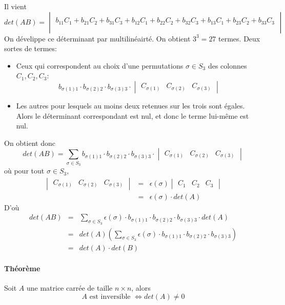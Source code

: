 Il vient
$$det(A B) = \begin{vmatrix} \\ b_{11} C_1 + b_{21} C_2 + b_{31} C_3 + b_{12} C_1 + b_{22} C_2 + b_{32} C_3 + b_{13} C_1 + b_{23} C_2 + b_{33} C_3 \\ \\ \end{vmatrix}$$
On dévelippe ce déterminant par multilinéairté. On obtient $3^3 = 27$ termes. Deux sortes de termes:
\begin{itemize}
  \item Ceux qui correspondent au choix d'une permutations $\sigma \in S_3$ des colonnes $C_1, C_2, C_3$:
    $$b_{\sigma(1) 1} \cdot b_{\sigma(2) 2} \cdot b_{\sigma(3) 3} \cdot \begin{vmatrix} C_{\sigma(1)} & C_{\sigma(2)} & C_{\sigma(3)} \end{vmatrix}$$
    
  \item Les autres pour lesquels au moins deux retenues sur les trois sont égales. Alors le déterminant correspondant est nul, et donc le terme lui-même est nul.
\end{itemize}
On obtient donc
$$det(A B) = \sum_{\sigma \in S_3} b_{\sigma(1) 1} \cdot b_{\sigma(2) 2} \cdot b_{\sigma(3) 3} \cdot \begin{vmatrix} C_{\sigma(1)} & C_{\sigma(2)} & C_{\sigma(3)} \end{vmatrix}$$
où pour tout $\sigma \in S_3$,
\begin{eqnarray*}
  \begin{vmatrix} C_{\sigma(1)} & C_{\sigma(2)} & C_{\sigma(3)} \end{vmatrix}
  &=& \epsilon(\sigma) \begin{vmatrix} C_1 & C_2 & C_ 3 \end{vmatrix} \\
    &=& \epsilon(\sigma) \cdot det(A)
\end{eqnarray*}
D'où
\begin{eqnarray*}
  det(A B) &=& \sum_{\sigma \in S_3} \epsilon(\sigma) \cdot b_{\sigma(1) 1} \cdot b_{\sigma(2) 2} \cdot b_{\sigma(3) 3} \cdot det(A) \\
    &=& det(A) \left( \sum_{\sigma \in S_3} \epsilon(\sigma) \cdot b_{\sigma(1) 1} \cdot b_{\sigma(2) 2} \cdot b_{\sigma(3) 3} \right) \\
    &=& det(A) \cdot det(B)
\end{eqnarray*}

\paragraph{Théorème} Soit $A$ une matrice carrée de taille $n \times n$, alors 
$$A \text{ est inversible } \Leftrightarrow det(A) \neq 0$$

